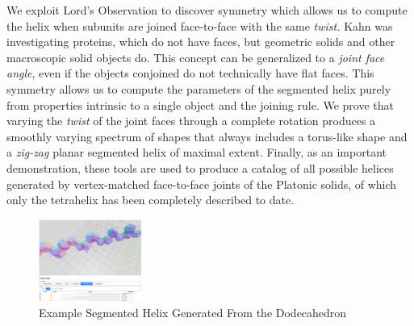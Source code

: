 \documentclass{svproc}
\begin{document}
We exploit Lord's Observation to discover symmetry which allows us to compute the helix when subunits are joined face-to-face with
the same {\em twist.} Kahn was investigating proteins, which do not have faces, but geometric solids and other macroscopic solid objects do.
This concept can be generalized to a {\em joint face angle}, even if the
objects conjoined do not technically have flat faces.
This symmetry allows us to compute the parameters of the segmented helix purely from
properties intrinsic to a single object and the joining rule.
We prove that varying the {\em twist} of the joint faces through a complete rotation produces a smoothly varying
spectrum of shapes that always includes a torus-like shape and a
{\em zig-zag} planar segmented helix of maximal extent.
Finally, as an important demonstration, these tools are used to produce
a catalog of all possible helices generated by vertex-matched face-to-face joints of the
Platonic solids, of which only the tetrahelix\cite{coxeter1985simplicial,sadler2019periodic,fuller1982synergetics,read2018transforming,pearce1990structure}
has been completely described to date.

\begin{figure}
     \centering
     \includegraphics[width=0.30\textwidth]{figures/Dodecahedral.png}
     \caption{Example Segmented Helix Generated From the Dodecahedron}
  \label{fig:dodecahedron}
\end{figure}



\end{document}
